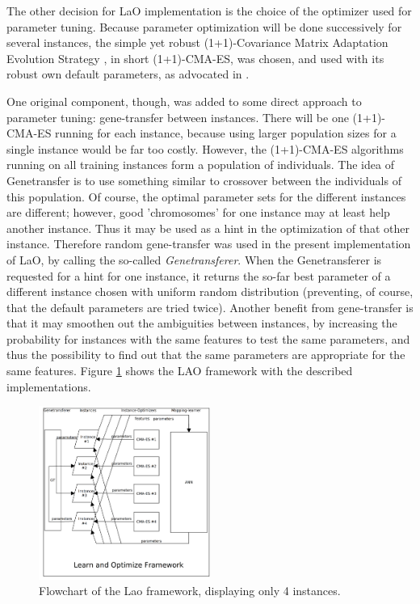 \documentclass{MYsig-alternate}
\begin{document}
The other decision for LaO implementation is the choice of the optimizer used for parameter tuning. Because parameter optimization will be done successively for several instances, the simple yet robust (1+1)-Covariance Matrix Adaptation Evolution Strategy \cite{hansen2001ecj}, in short (1+1)-CMA-ES,  was chosen, and used with its robust own default parameters, as advocated in \cite{BibGECCO:2010}.

One original component, though, was added to some direct approach to parameter tuning: gene-transfer between instances. There will be one (1+1)-CMA-ES running for each instance, because using larger population sizes for a single instance would be far too costly. However, the (1+1)-CMA-ES algorithms running on all training instances form a population of individuals. The idea of Genetransfer is to use something similar to crossover between the individuals of this population. Of course, the optimal parameter sets for the different instances are different; however, good 'chromosomes' for one instance may at least help another instance. Thus it may be used as a hint in the optimization of that other instance. Therefore random gene-transfer was used in the present implementation of LaO, by calling the so-called {\em Genetransferer}. When the Genetransferer is requested for a hint for one instance, it returns the so-far best parameter of a different instance chosen with uniform random distribution (preventing, of course, that the default parameters are tried twice). Another benefit from gene-transfer is that it may smoothen out the ambiguities between instances, by increasing the probability for instances with the same features to test the same parameters, and thus the possibility to find out that the same parameters are appropriate for the same features. Figure \ref{figure:laoflowchart} shows the LAO framework with the described implementations.

\begin{figure}[h!]
  \centering
    \includegraphics[width=0.5\textwidth]{lao.png}
  \caption{Flowchart of the Lao framework, displaying only 4 instances.}
\label{figure:laoflowchart}
\end{figure}
\end{document}
